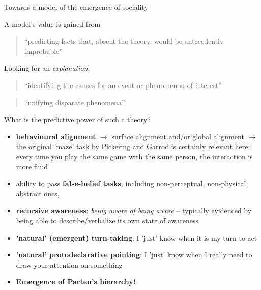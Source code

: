 \documentclass[compress]{beamer}
\begin{document}
{
\begin{frame}{Towards a model of the emergence of sociality}

        A model's value is gained from
    \begin{quote}
        ``predicting facts that, absent the theory, would be antecedently
        improbable''
    \end{quote}

    Looking for an \emph{explanation}: 
    \begin{quote}
        ``identifying the causes for an event or phenomenon of interest''
    \end{quote}
    \begin{quote}
        ``unifying disparate phenomena''
    \end{quote}
\end{frame}
}

\begin{frame}{What is the predictive power of such a theory?}

    \begin{itemize}

        \item {\bf behavioural alignment} $\rightarrow$ surface alignment and/or
            global alignment $\rightarrow$ the original 'maze' task by Pickering
            and Garrod is certainly relevant here: every time you play the same
            game with the same person, the interaction is more fluid

        \item ability to pass {\bf false-belief tasks}, including
            non-perceptual, non-physical, abstract ones,

        \item {\bf recursive awareness}: \emph{being aware of being aware} -- typically
            evidenced by being able to describe/verbalize its own state of
            awareness 

        \item {\bf 'natural' (\ie emergent) turn-taking}: I 'just' know when it is my
            turn to act

        \item {\bf 'natural' protodeclarative pointing}: I 'just' know when I really
            need to draw your attention on something

        \item {\bf Emergence of Parten's hierarchy!}

    \end{itemize}

\end{frame}
\end{document}
